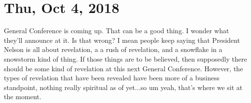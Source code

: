 \section{Thu, Oct 4, 2018}

General Conference is coming up. That can be a good thing. I wonder what they'll
announce at it. Is that wrong? I mean people keep saying that President Nelson is all
about revelation, a a rush of revelation, and a snowflake in a snowstorm kind of
thing. If those things are to be believed, then supposedly there should be some kind
of revelation at this next General Conference. However, the types of revelation that
have been revealed have been more of a business standpoint, nothing really spiritual
as of yet...so um yeah, that's where we sit at the moment.